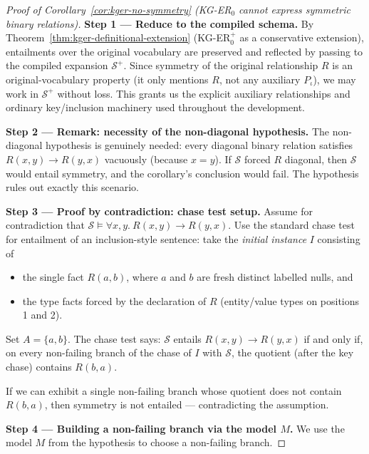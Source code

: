 \documentclass[10pt]{article}
\begin{document}
\begin{proof}[Proof of Corollary~\ref{cor:kger-no-symmetry} (KG-ER$_0$ cannot express symmetric binary relations)]

\smallskip\noindent\textbf{Step 1 --- Reduce to the compiled schema.}
By Theorem~\ref{thm:kger-definitional-extension} (KG-ER\(_0^+\) as a
conservative extension), entailments over the original vocabulary are
preserved and reflected by passing to the compiled expansion
\(\mathcal S^+\).  Since symmetry of the original relationship \(R\)
is an original-vocabulary property (it only mentions \(R\), not any
auxiliary \(P_\iota\)), we may work in \(\mathcal S^+\) without loss.
This grants us the explicit auxiliary relationships and ordinary
key/inclusion machinery used throughout the development.

\smallskip\noindent\textbf{Step 2 --- Remark: necessity of the
non-diagonal hypothesis.}
The non-diagonal hypothesis is genuinely needed: every diagonal binary
relation satisfies \(R(x,y)\to R(y,x)\) vacuously (because \(x=y\)).
If \(\mathcal S\) forced \(R\) diagonal, then \(\mathcal S\) would
entail symmetry, and the corollary's conclusion would fail.  The
hypothesis rules out exactly this scenario.

\smallskip\noindent\textbf{Step 3 --- Proof by contradiction: chase
test setup.}
Assume for contradiction that
\(\mathcal S\models\forall x,y.\ R(x,y)\to R(y,x)\).  Use the standard
chase test for entailment of an inclusion-style sentence: take the
\emph{initial instance} \(I\) consisting of
\begin{itemize}
\item the single fact \(R(a,b)\), where \(a\) and \(b\) are fresh
distinct labelled nulls, and
\item the type facts forced by the declaration of \(R\) (entity/value
types on positions 1 and 2).
\end{itemize}
Set \(A=\{a,b\}\).  The chase test says: \(\mathcal S\) entails
\(R(x,y)\to R(y,x)\) if and only if, on every non-failing branch of
the chase of \(I\) with \(\mathcal S\), the quotient (after the key
chase) contains \(R(b,a)\).

If we can exhibit a single non-failing branch whose quotient does not
contain \(R(b,a)\), then symmetry is not entailed --- contradicting
the assumption.

\smallskip\noindent\textbf{Step 4 --- Building a non-failing branch
via the model \(M\).}
We use the model \(M\) from the hypothesis to choose a non-failing
branch.


\end{proof}
\end{document}

